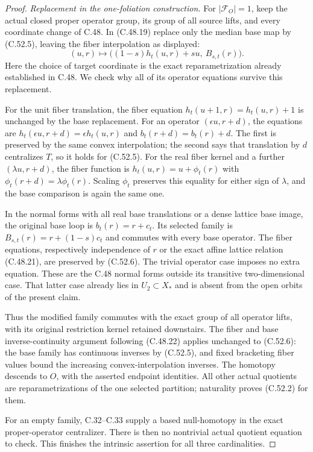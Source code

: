 \begin{proof}
\emph{Replacement in the one-foliation construction.}
For $|\mathscr F_O|=1$, keep the actual closed proper
operator group, its group of all source lifts, and
every coordinate change of C.48.
In (C.48.19) replace only the median base map by
(C.52.5), leaving the fiber interpolation as displayed:
\[
 (u,r)\longmapsto
       \bigl((1-s)h_t(u,r)+su,\ B_{s,t}(r)\bigr).        \tag{C.52.6}
\]
Here the choice of target coordinate is the exact
reparametrization already established in C.48.
We check why all of its operator equations survive
this replacement.

For the unit fiber translation, the fiber equation
$h_t(u+1,r)=h_t(u,r)+1$ is unchanged by the base
replacement. For an operator $(\epsilon u,r+d)$,
the equations are
$h_t(\epsilon u,r+d)=\epsilon h_t(u,r)$ and
$b_t(r+d)=b_t(r)+d$. The first is preserved by
the same convex interpolation; the second says
that translation by $d$ centralizes $T$, so it
holds for (C.52.5).
For the real fiber kernel and a further
$(\lambda u,r+d)$, the fiber function is
$h_t(u,r)=u+\phi_t(r)$ with
$\phi_t(r+d)=\lambda\phi_t(r)$. Scaling $\phi_t$
preserves this equality for either sign of $\lambda$,
and the base comparison is again the same one.

In the normal forms with all real base translations
or a dense lattice base image, the original base
loop is $b_t(r)=r+c_t$. Its selected family is
$B_{s,t}(r)=r+(1-s)c_t$ and commutes with every base
operator. The fiber equations, respectively
independence of $r$ or the exact affine lattice
relation (C.48.21), are preserved by (C.52.6).
The trivial operator case imposes no extra equation.
These are the C.48 normal forms outside its
transitive two-dimensional case. That latter case
already lies in $U_2\subset X_*$ and is absent from
the open orbits of the present claim.

Thus the modified family commutes with the exact
group of all operator lifts, with its original
restriction kernel retained downstairs.
The fiber and base inverse-continuity argument
following (C.48.22) applies unchanged to (C.52.6):
the base family has continuous inverses by
(C.52.5), and fixed bracketing fiber values bound
the increasing convex-interpolation inverses.
The homotopy descends to $O$, with the asserted
endpoint identities. All other actual quotients
are reparametrizations of the one selected
partition; naturality proves (C.52.2) for them.

For an empty family, C.32--C.33 supply a based
null-homotopy in the exact proper-operator
centralizer. There is then no nontrivial actual
quotient equation to check. This finishes the
intrinsic assertion for all three cardinalities.


\end{proof}
